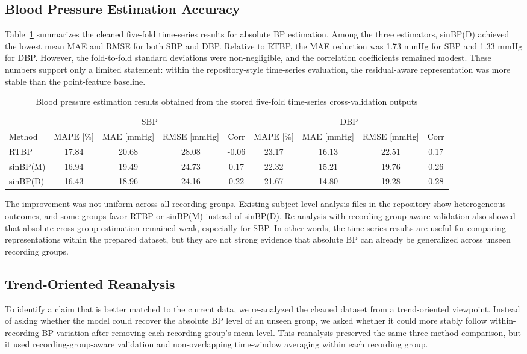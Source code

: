 \documentclass[twocolumn]{svjour3}
\begin{document}
\subsection{Blood Pressure Estimation Accuracy}
Table~\ref{tab:bp_results} summarizes the cleaned five-fold time-series results for absolute BP estimation. Among the three estimators, sinBP(D) achieved the lowest mean MAE and RMSE for both SBP and DBP. Relative to RTBP, the MAE reduction was 1.73 mmHg for SBP and 1.33 mmHg for DBP. However, the fold-to-fold standard deviations were non-negligible, and the correlation coefficients remained modest. These numbers support only a limited statement: within the repository-style time-series evaluation, the residual-aware representation was more stable than the point-feature baseline.

\begin{table}[t]
\caption{Blood pressure estimation results obtained from the stored five-fold time-series cross-validation outputs}
\label{tab:bp_results}
\centering
\footnotesize
\begin{tabular}{lcccccccc}
\toprule
& \multicolumn{4}{c}{SBP} & \multicolumn{4}{c}{DBP} \\
\cmidrule(lr){2-5}\cmidrule(lr){6-9}
Method & MAPE [\%] & MAE [mmHg] & RMSE [mmHg] & Corr & MAPE [\%] & MAE [mmHg] & RMSE [mmHg] & Corr \\
\midrule
RTBP & 17.84 & 20.68 & 28.08 & -0.06 & 23.17 & 16.13 & 22.51 & 0.17 \\
sinBP(M) & 16.94 & 19.49 & 24.73 & 0.17 & 22.32 & 15.21 & 19.76 & 0.26 \\
sinBP(D) & 16.43 & 18.96 & 24.16 & 0.22 & 21.67 & 14.80 & 19.28 & 0.28 \\
\bottomrule
\end{tabular}
\end{table}

The improvement was not uniform across all recording groups. Existing subject-level analysis files in the repository show heterogeneous outcomes, and some groups favor RTBP or sinBP(M) instead of sinBP(D). Re-analysis with recording-group-aware validation also showed that absolute cross-group estimation remained weak, especially for SBP. In other words, the time-series results are useful for comparing representations within the prepared dataset, but they are not strong evidence that absolute BP can already be generalized across unseen recording groups.

\subsection{Trend-Oriented Reanalysis}
To identify a claim that is better matched to the current data, we re-analyzed the cleaned dataset from a trend-oriented viewpoint. Instead of asking whether the model could recover the absolute BP level of an unseen group, we asked whether it could more stably follow within-recording BP variation after removing each recording group's mean level. This reanalysis preserved the same three-method comparison, but it used recording-group-aware validation and non-overlapping time-window averaging within each recording group.
\end{document}
